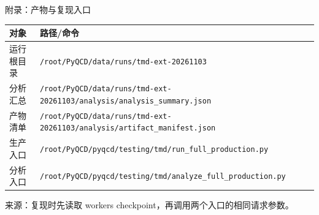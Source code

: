 \documentclass[UTF8,aspectratio=169,11pt]{ctexbeamer}
\newcommand{\source}[1]{\vspace{0.06em}\par{\raggedright\scriptsize\color{muted}来源：#1\par}}
\begin{document}
\begin{frame}[t]{附录：产物与复现入口}
  \small\begin{tabularx}{\linewidth}{@{}l X@{}}\toprule 对象 & 路径/命令 \\ \midrule 运行根目录 & \nolinkurl{/root/PyQCD/data/runs/tmd-ext-20261103} \\ 分析汇总 & \nolinkurl{/root/PyQCD/data/runs/tmd-ext-20261103/analysis/analysis_summary.json} \\ 产物清单 & \nolinkurl{/root/PyQCD/data/runs/tmd-ext-20261103/analysis/artifact_manifest.json} \\ 生产入口 & \nolinkurl{/root/PyQCD/pyqcd/testing/tmd/run_full_production.py} \\ 分析入口 & \nolinkurl{/root/PyQCD/pyqcd/testing/tmd/analyze_full_production.py} \\ \bottomrule\end{tabularx}

  \source{复现时先读取 workers checkpoint，再调用两个入口的相同请求参数。}
\end{frame}
\end{document}
